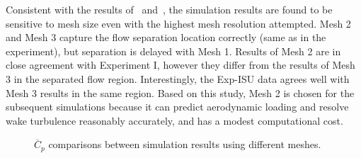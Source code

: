 Consistent with the results of~\cite{travin2000detached}
and~\cite{breuer2000challenging}, the simulation results are found to be
sensitive to mesh size even with the highest mesh resolution attempted. Mesh 2
and Mesh 3 capture the flow separation location correctly (same as in the
experiment), but separation is delayed with Mesh 1. Results of Mesh 2 are in
close agreement with Experiment I, however they differ from the results of Mesh
3 in the separated flow region. Interestingly, the Exp-ISU data agrees well
with Mesh 3 results in the same region. Based on this study, Mesh 2 is chosen
for the subsequent simulations because it can predict aerodynamic loading and
resolve wake turbulence reasonably accurately, and has a modest computational
cost.
%
\begin{figure}[htb!]
  \centering
  \caption{$\overline{C}_p$ comparisons between simulation results using
  different meshes.}
  \label{fig:Cp_compare_LS_Mesh}
\end{figure}

